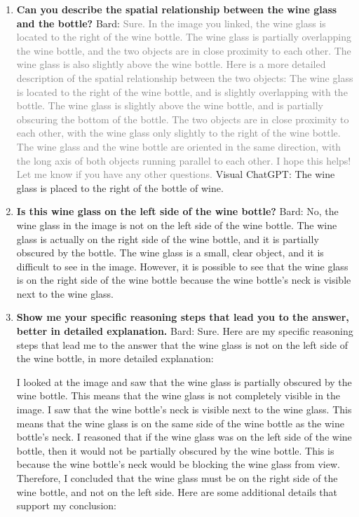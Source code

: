     \begin{enumerate}
        \item \textbf{Can you describe the spatial relationship between the wine glass and the bottle?}
        \subitem Bard: \textcolor{gray}{
        Sure. In the image you linked, the wine glass is located to the right of the wine bottle. The wine glass is partially overlapping the wine bottle, and the two objects are in close proximity to each other. The wine glass is also slightly above the wine bottle.
        Here is a more detailed description of the spatial relationship between the two objects:
        The wine glass is located to the right of the wine bottle, and is slightly overlapping with the bottle.
        The wine glass is slightly above the wine bottle, and is partially obscuring the bottom of the bottle.
        The two objects are in close proximity to each other, with the wine glass only slightly to the right of the wine bottle.
        The wine glass and the wine bottle are oriented in the same direction, with the long axis of both objects running parallel to each other.
        I hope this helps! Let me know if you have any other questions.}
        \subitem Visual ChatGPT: The wine glass is placed to the right of the bottle of wine.
        \item \textbf{Is this wine glass on the left side of the wine bottle?}
        \subitem Bard: 
        No, the wine glass in the image is not on the left side of the wine bottle. The wine glass is actually on the right side of the wine bottle, and it is partially obscured by the bottle. The wine glass is a small, clear object, and it is difficult to see in the image. However, it is possible to see that the wine glass is on the right side of the wine bottle because the wine bottle's neck is visible next to the wine glass.
        \item \textbf{Show me your specific reasoning steps that lead you to the answer, better in detailed explanation.}
        \subitem Bard: Sure. Here are my specific reasoning steps that lead me to the answer that the wine glass is not on the left side of the wine bottle, in more detailed explanation:

        I looked at the image and saw that the wine glass is partially obscured by the wine bottle. This means that the wine glass is not completely visible in the image.
        I saw that the wine bottle's neck is visible next to the wine glass. This means that the wine glass is on the same side of the wine bottle as the wine bottle's neck.
        I reasoned that if the wine glass was on the left side of the wine bottle, then it would not be partially obscured by the wine bottle. This is because the wine bottle's neck would be blocking the wine glass from view.
        Therefore, I concluded that the wine glass must be on the right side of the wine bottle, and not on the left side.
        Here are some additional details that support my conclusion:
        

\end{enumerate}
